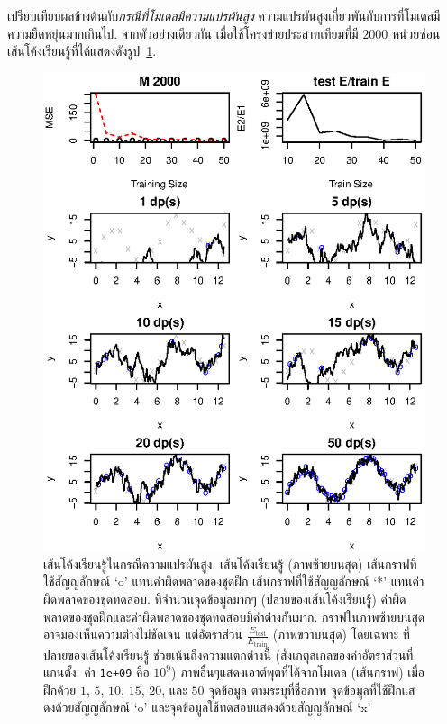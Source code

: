 เปรียบเทียบผลข้างต้นกับ\textit{กรณีที่โมเดลมีความแปรผันสูง}
ความแปรผันสูงเกี่ยวพันกับการที่โมเดลมีความยืดหยุ่นมากเกินไป.
จากตัวอย่างเดียวกัน เมื่อใช้โครงข่ายประสาทเทียมที่มี $2000$ หน่วยซ่อน เส้นโค้งเรียนรู้ที่ได้แสดงดังรูป~\ref{fig: more ann learning curve high variance M2000}.

%
\begin{figure}
\begin{center}
\includegraphics[width=5.5in]{04ANNlearncurve/LCHiVarianceM2000.eps}
\end{center}
\caption{เส้นโค้งเรียนรู้ในกรณีความแปรผันสูง.
เส้นโค้งเรียนรู้ (ภาพซ้ายบนสุด) 
เส้นกราฟที่ใช้สัญญลักษณ์ `o' แทนค่าผิดพลาดของชุดฝึก
เส้นกราฟที่ใช้สัญญลักษณ์ `*' แทนค่าผิดพลาดของชุดทดสอบ. 
ที่จำนวนจุดข้อมูลมากๆ (ปลายของเส้นโค้งเรียนรู้) ค่าผิดพลาดของชุดฝึกและค่าผิดพลาดของชุดทดสอบมีค่าต่างกันมาก.
กราฟในภาพซ้ายบนสุดอาจมองเห็นความต่างไม่ชัดเจน แต่อัตราส่วน $\frac{E_{\mathrm{test}}}{E_{\mathrm{train}}}$ (ภาพขวาบนสุด) โดยเฉพาะ%
ที่ปลายของเส้นโค้งเรียนรู้ ช่วยเน้นถึงความแตกต่างนี้ 
(สังเกตุสเกลของค่าอัตราส่วนที่แกนตั้ง.
ค่า \texttt{1e+09} คือ $10^9$)
ภาพอื่นๆแสดงเอาต์พุตที่ได้จากโมเดล (เส้นกราฟ) เมื่อฝึกด้วย $1$, $5$, $10$, $15$, $20$, และ $50$ จุดข้อมูล ตามระบุที่ชื่อภาพ
จุดข้อมูลที่ใช้ฝึกแสดงด้วยสัญญลักษณ์ `o' 
และจุดข้อมูลใช้ทดสอบแสดงด้วยสัญญลักษณ์ `x'}
\label{fig: more ann learning curve high variance M2000}
\end{figure}

